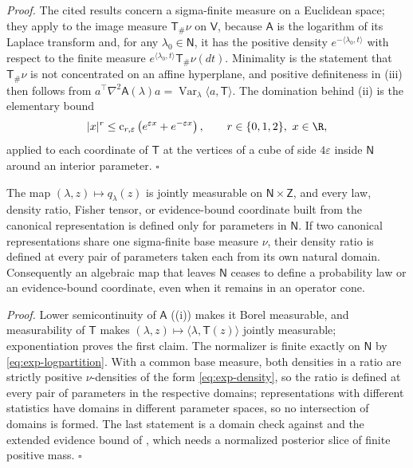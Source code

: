 \noindent\emph{Proof.}
The cited results concern a sigma-finite measure on a Euclidean space; they
apply to the image measure \(\mathsf T_\#\nu\) on \(\mathsf V\), because
\(\mathsf A\) is the logarithm of its Laplace transform and, for any
\(\lambda_0\in\mathsf N\), it has the positive density
\(e^{-\langle\lambda_0,t\rangle}\) with respect to the finite measure
\(e^{\langle\lambda_0,t\rangle}\mathsf T_\#\nu(dt)\). Minimality is the
statement that \(\mathsf T_\#\nu\) is not concentrated on an affine
hyperplane, and positive definiteness in (iii) then follows from
\(a^\top\nabla^2\mathsf A(\lambda)a=\operatorname{Var}_\lambda\langle a,\mathsf T\rangle\).
The domination behind (ii) is the elementary bound
\begin{equation}
|x|^r\leq \mathrm c_{r,\varepsilon}\left(e^{\varepsilon x}+e^{-\varepsilon x}\right),
\qquad r\in\{0,1,2\},\ x\in\R,
\label{eq:exp-domination}
\end{equation}
applied to each coordinate of \(\mathsf T\) at the vertices of a cube of side
\(4\varepsilon\) inside \(\mathsf N\) around an interior parameter.
\(\square\)

The map \((\lambda,z)\mapsto q_\lambda(z)\) is jointly measurable on
\(\mathsf N\times\mathsf Z\), and every law, density ratio, Fisher tensor, or
evidence-bound coordinate built from the canonical representation is defined
only for parameters in \(\mathsf N\). If two canonical representations share
one sigma-finite base measure \(\nu\), their density ratio is defined at every
pair of parameters taken each from its own natural domain. Consequently an
algebraic map that leaves \(\mathsf N\) ceases to define a probability law or
an evidence-bound coordinate, even when it remains in an operator cone.

\noindent\emph{Proof.}
Lower semicontinuity of \(\mathsf A\)
((i)) makes it Borel measurable, and
measurability of \(\mathsf T\) makes \((\lambda,z)\mapsto\langle\lambda,
\mathsf T(z)\rangle\) jointly measurable; exponentiation proves the first
claim. The normalizer is finite exactly on \(\mathsf N\) by
\eqref{eq:exp-logpartition}. With a common base measure, both densities in a
ratio are strictly positive \(\nu\)-densities of the form
\eqref{eq:exp-density}, so the ratio is defined at every pair of parameters in
the respective domains; representations with different statistics have
domains in different parameter spaces, so no intersection of domains is
formed. The last statement is a domain check against
 and the extended evidence bound of
, which needs a normalized posterior slice of finite
positive mass. \(\square\)

